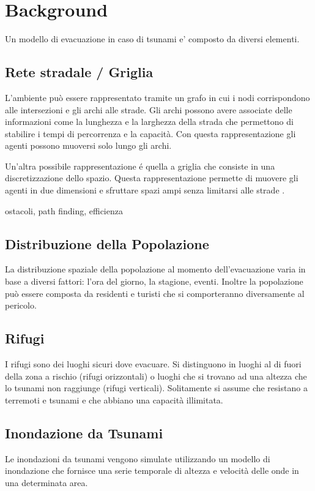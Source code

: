 \section{Background}
Un modello di evacuazione in caso di tsunami e' composto da diversi elementi.

\subsection{Rete stradale / Griglia}
L'ambiente può essere rappresentato tramite un grafo in cui i nodi corrispondono alle intersezioni e
gli archi alle strade.
Gli archi possono avere associate delle informazioni come la lunghezza e la larghezza della strada che
permettono di stabilire i tempi di percorrenza e la capacità.
Con questa rappresentazione gli agenti possono muoversi solo lungo gli archi.

Un'altra possibile rappresentazione é quella a griglia che consiste in una discretizzazione
dello spazio. Questa rappresentazione permette di muovere gli agenti in due dimensioni e sfruttare
spazi ampi senza limitarsi alle strade \cite{makinoshima2018enhancing}.

ostacoli, path finding, efficienza


\subsection{Distribuzione della Popolazione}
La distribuzione spaziale della popolazione al momento dell'evacuazione varia in base a diversi fattori:
l'ora del giorno, la stagione, eventi. Inoltre la popolazione può essere composta da residenti e
turisti che si comporteranno diversamente al pericolo.

\subsection{Rifugi}
I rifugi sono dei luoghi sicuri dove evacuare.
Si distinguono in luoghi al di fuori della zona a rischio (rifugi orizzontali) o
luoghi che si trovano ad una altezza che lo tsunami non raggiunge (rifugi verticali).
%
Solitamente si assume che resistano a terremoti e tsunami e
che abbiano una capacità illimitata.

\subsection{Inondazione da Tsunami}
Le inondazioni da tsunami vengono simulate utilizzando un modello di inondazione
che fornisce una serie temporale di altezza e velocità delle onde in una determinata area.

